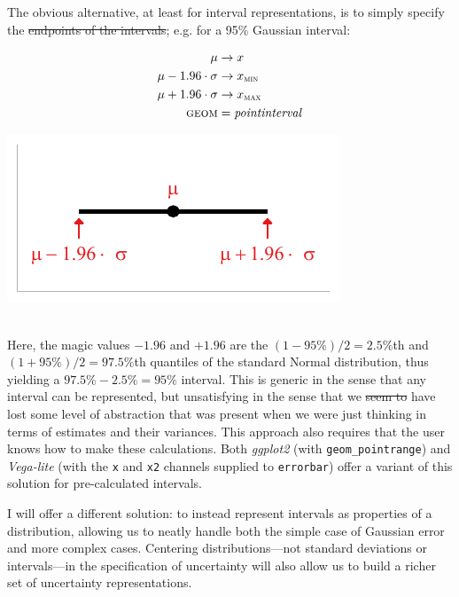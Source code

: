\documentclass[journal]{vgtc}                     %
\newcommand{\equationfigure}[2]{%
\noindent
\begin{minipage}{.5\columnwidth}
\setlength{\abovedisplayskip}{0pt} %
\setlength{\belowdisplayskip}{0pt} %
#1\end{minipage}%
\begin{minipage}{.4\columnwidth}\centering #2 \end{minipage}%
\vspace{.5\belowdisplayskip}\\
}
\providecommand{\DIFadd}[1]{{\protect\color{blue}\uwave{#1}}} %
\providecommand{\DIFdel}[1]{{\protect\color{red}\sout{#1}}}                      %
\providecommand{\DIFaddbegin}{} %
\providecommand{\DIFaddend}{} %
\providecommand{\DIFdelbegin}{} %
\providecommand{\DIFdelend}{} %
\begin{document}
The obvious alternative, at least for interval representations, is to simply specify the \DIFdelbegin \DIFdel{endpoints of the intervals}\DIFdelend \DIFaddbegin \DIFadd{interval endpoints}\DIFaddend ; e.g. for a 95\% Gaussian interval:

\equationfigure{
\begin{align*}
\mu &\rightarrow x\\
\mu - 1.96 \cdot \sigma &\rightarrow x_\textsc{min}\\
\mu + 1.96 \cdot \sigma &\rightarrow x_\textsc{max}\\
\textsc{geom} &= \mathit{pointinterval}
\end{align*}
}{\includegraphics[width=1.2\columnwidth]{figs/2-xmin_xmax_interval.pdf}}
Here, the magic values $-1.96$ and $+1.96$ are the $(1-95\%)/2 = 2.5\%$th and $(1+95\%)/2 = 97.5\%$th quantiles of the standard Normal distribution, thus yielding a $97.5\% - 2.5\% = 95\%$ interval. This is generic in the sense that any interval can be represented, but unsatisfying in the sense that we \DIFdelbegin \DIFdel{seem to }\DIFdelend have lost some level of abstraction that was present when we were just thinking in terms of estimates and their variances. This approach also requires that the user knows how to make these calculations. Both \textit{ggplot2} (with \texttt{geom\_pointrange}) and \textit{Vega-lite} (with the \texttt{x} and \texttt{x2} channels supplied to \texttt{errorbar}) offer a variant of this solution for pre-calculated intervals. 

I will offer a different solution: to instead represent intervals as properties of a distribution, allowing us to neatly handle both the simple case of Gaussian error and more complex cases. Centering distributions---not standard deviations or intervals---in the specification of uncertainty will also allow us to build a richer set of uncertainty representations.
\end{document}
